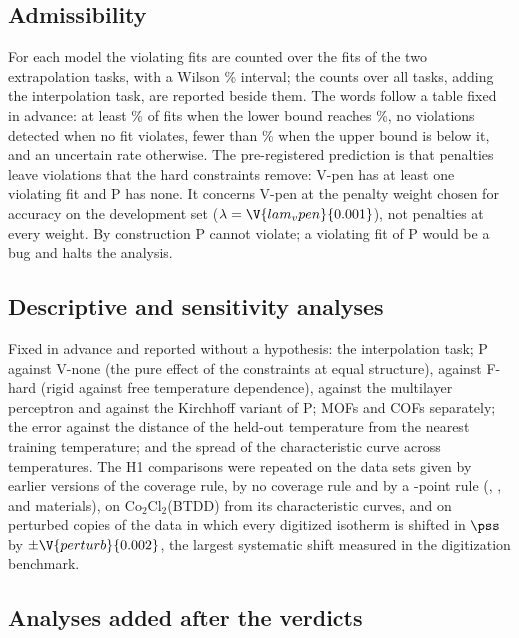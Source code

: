 \documentclass[journal=jcisd8,manuscript=article]{achemso}
\begin{document}
\subsection*{Admissibility}

For each model the violating fits are counted over the  fits of the two extrapolation tasks, with a
Wilson \% interval; the counts over all tasks, adding the interpolation task, are reported beside
them. The words follow a table fixed in advance: at least \% of fits when the lower bound
reaches \%, no violations detected when no fit violates, fewer than \% when
the upper bound is below it, and an uncertain rate otherwise. The pre-registered prediction is that penalties leave
violations that the hard constraints remove: V-pen has at least one violating fit and P has none. It concerns V-pen
at the penalty weight chosen for accuracy on the development set ($\lambda = \V{lam_vpen}{0.001}$), not penalties
at every weight. By construction P cannot violate; a violating fit of P would be a bug and halts the analysis.

\subsection*{Descriptive and sensitivity analyses}

Fixed in advance and reported without a hypothesis: the interpolation task; P against V-none (the pure effect of the
constraints at equal structure), against F-hard (rigid against free temperature dependence), against the
multilayer perceptron and against the Kirchhoff variant of P; MOFs and COFs separately; the error against the
distance of the held-out temperature from the nearest training temperature; and the spread of the characteristic
curve across temperatures. The H1 comparisons were repeated on the data sets given by earlier versions of the
coverage rule, by no coverage rule and by a -point rule (, ,  and 
materials), on Co$_2$Cl$_2$(BTDD) from its characteristic curves, and on  perturbed copies of
the data in which every digitized isotherm is shifted in $\pss$ by $\pm\V{perturb}{0.002}$, the largest systematic
shift measured in the digitization benchmark.

\subsection*{Analyses added after the verdicts}
\end{document}
